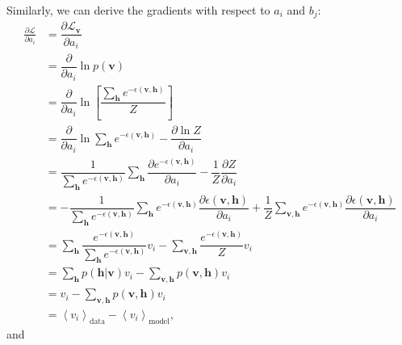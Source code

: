 \documentclass[10pt, a4paper]{article}
\begin{document}
Similarly, we can derive the gradients with respect to $a_i$ and $b_j$:
\begin{align}
  \frac{\partial \mathcal{L}}{\partial a_i} &= \dfrac{\partial \mathcal{L}_{\mathbf{v}}}{\partial a_i} \nonumber \\
  &= \dfrac{\partial}{\partial a_i} \ln p(\mathbf{v}) \nonumber \\
  &= \dfrac{\partial}{\partial a_i} \ln \left[\dfrac{\sum_{\mathbf{h}}
        e^{-\epsilon(\mathbf{v}, \mathbf{h})}}{Z}\right] \nonumber \\
  &= \dfrac{\partial}{\partial a_i} \ln \sum_{\mathbf{h}}
        e^{-\epsilon(\mathbf{v}, \mathbf{h})}
        - \dfrac{\partial  \ln Z}{\partial a_i} \nonumber \\
  &= \dfrac{1}{\sum_{\mathbf{h}} e^{-\epsilon(\mathbf{v}, \mathbf{h})}}
      \sum_{\mathbf{h}} \dfrac{\partial e^{-\epsilon(\mathbf{v}, \mathbf{h})}}{\partial a_i}
        - \dfrac{1}{Z} \dfrac{\partial Z}{\partial a_i} \nonumber \\
  &= -\dfrac{1}{\sum_{\mathbf{h}} e^{-\epsilon(\mathbf{v}, \mathbf{h})}}
      \sum_{\mathbf{h}} e^{-\epsilon(\mathbf{v}, \mathbf{h})} \dfrac{\partial \epsilon(\mathbf{v}, \mathbf{h})}{\partial a_i}
        + \dfrac{1}{Z} \sum_{\mathbf{v}, \mathbf{h}} e^{-\epsilon(\mathbf{v},\mathbf{h})}
        \dfrac{\partial \epsilon(\mathbf{v}, \mathbf{h})}{\partial a_i} \nonumber \\
  &= \sum_{\mathbf{h}} \dfrac{e^{-\epsilon(\mathbf{v}, \mathbf{h})}}{\sum_{\mathbf{h}} e^{-\epsilon(\mathbf{v}, \mathbf{h})}} v_i
        - \sum_{\mathbf{v}, \mathbf{h}} \dfrac{e^{-\epsilon(\mathbf{v},\mathbf{h})}}{Z} v_i \nonumber \\
  &= \sum_{\mathbf{h}} p(\mathbf{h}|\mathbf{v}) v_i - \sum_{\mathbf{v}, \mathbf{h}} p(\mathbf{v},\mathbf{h}) v_i \nonumber \\
  &= v_i - \sum_{\mathbf{v}, \mathbf{h}} p(\mathbf{v},\mathbf{h}) v_i \nonumber \\
  &=\left<v_i\right>_{\text{data}} - \left<v_i\right>_{\text{model}}, \label{eq:gradient_a_final}
\end{align}
and
\end{document}
